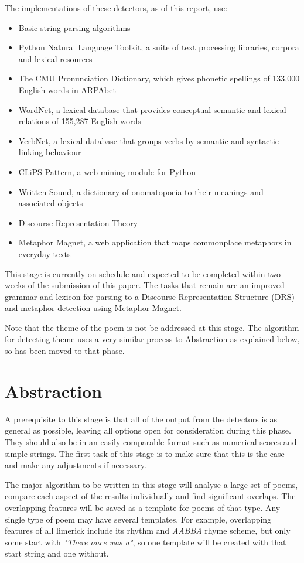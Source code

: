 The implementations of these detectors, as of this report, use:
\begin{itemize}
\setlength{\itemsep}{0pt}
\item{Basic string parsing algorithms}
\item{Python Natural Language Toolkit, a suite of text processing libraries, corpora and lexical resources}
\item{The CMU Pronunciation Dictionary, which gives phonetic spellings of 133,000 English words in ARPAbet}
\item{WordNet, a lexical database that provides conceptual-semantic and lexical relations of 155,287 English words}
\item{VerbNet, a lexical database that groups verbs by semantic and syntactic linking behaviour}
\item{CLiPS Pattern, a web-mining module for Python}
\item{Written Sound, a dictionary of onomatopoeia to their meanings and associated objects}
\item{Discourse Representation Theory}
\item{Metaphor Magnet, a web application that maps commonplace metaphors in everyday texts}
\end{itemize}

This stage is currently on schedule and expected to be completed within two weeks of the submission of this paper. The tasks that remain are an improved grammar and lexicon for parsing to a Discourse Representation Structure (DRS) and metaphor detection using Metaphor Magnet.

Note that the theme of the poem is not be addressed at this stage. The algorithm for detecting theme uses a very similar process to Abstraction as explained below, so has been moved to that phase.

\section{Abstraction}

A prerequisite to this stage is that all of the output from the detectors is as general as possible, leaving all options open for consideration during this phase. They should also be in an easily comparable format such as numerical scores and simple strings. The first task of this stage is to make sure that this is the case and make any adjustments if necessary.

The major algorithm to be written in this stage will analyse a large set of poems, compare each aspect of the results individually and find significant overlaps. The overlapping features will be saved as a template for poems of that type. Any single type of poem may have several templates. For example, overlapping features of all limerick include its rhythm and \textit{AABBA} rhyme scheme, but only some start with \textit{"There once was a"}, so one template will be created with that start string and one without.

